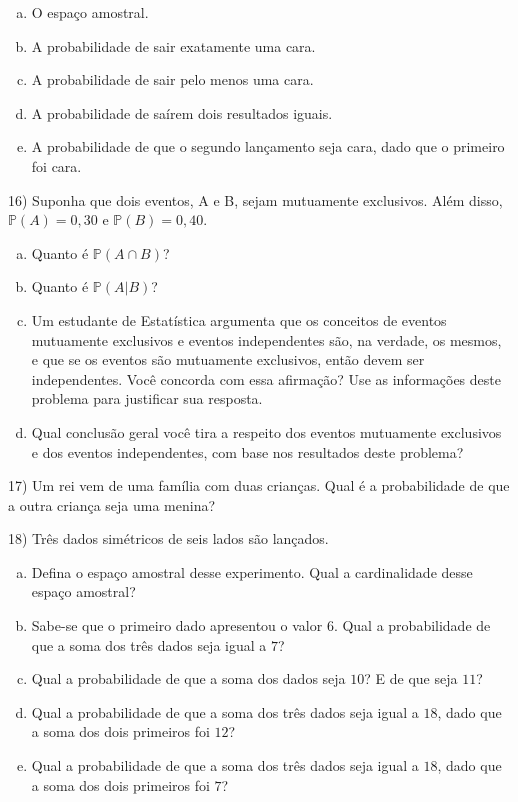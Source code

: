 \documentclass{article}
\begin{document}
\begin{enumerate}[a)]
    \item O espaço amostral.
    \item A probabilidade de sair exatamente uma cara.
    \item A probabilidade de sair pelo menos uma cara.
    \item A probabilidade de saírem dois resultados iguais.
    \item A probabilidade de que o segundo lançamento seja cara, dado que o primeiro foi cara.
\end{enumerate}

\vspace{5px}

16) Suponha que dois eventos, A e B, sejam mutuamente exclusivos. Além disso, $\mathds{P}(A) = 0,30$ e $\mathds{P}(B) = 0,40$.

\begin{enumerate}[a)]
    \item Quanto é $\mathds{P}(A \cap B)$?
    \item Quanto é $\mathds{P}(A | B)$?
    \item Um estudante de Estatística argumenta que os conceitos de eventos mutuamente exclusivos e eventos independentes são, na verdade, os mesmos, e que se os eventos são mutuamente exclusivos, então devem ser independentes. Você concorda com essa afirmação? Use as informações deste problema para justificar sua resposta.
    \item Qual conclusão geral você tira a respeito dos eventos mutuamente exclusivos e dos eventos independentes, com base nos resultados deste problema?
\end{enumerate}

\vspace{5px}

17) Um rei vem de uma família com duas crianças. Qual é a probabilidade de que a outra criança seja uma menina?

\vspace{5px}

18) Três dados simétricos de seis lados são lançados.
\begin{enumerate}[a)]
    \item Defina o espaço amostral desse experimento. Qual a cardinalidade desse espaço amostral?
    \item Sabe-se que o primeiro dado apresentou o valor $6$. Qual a probabilidade de que a soma dos três dados seja igual a $7$?
    \item Qual a probabilidade de que a soma dos dados seja $10$? E de que seja $11$?
    \item Qual a probabilidade de que a soma dos três dados seja igual a $18$, dado que a soma dos dois primeiros foi $12$?
    \item Qual a probabilidade de que a soma dos três dados seja igual a $18$, dado que a soma dos dois primeiros foi $7$?
\end{enumerate}
\end{document}

